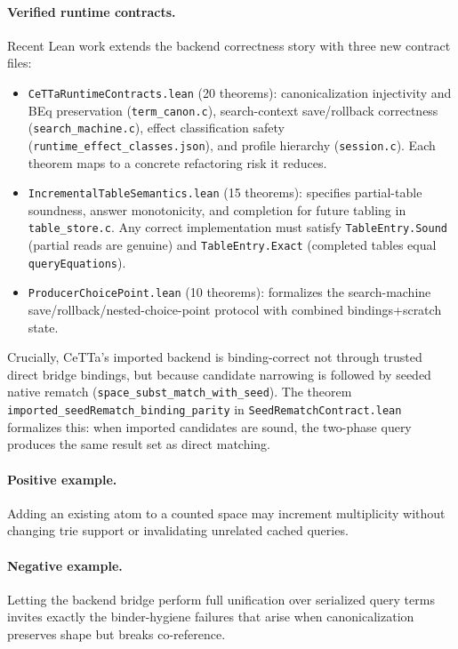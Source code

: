 \documentclass[11pt]{article}
\newcommand{\code}[1]{\texttt{#1}}
\newcommand{\CeTTa}{\textup{CeTTa}}
\begin{document}
\paragraph{Verified runtime contracts.}
Recent Lean work extends the backend correctness story with three new contract files:
\begin{itemize}
\item \code{CeTTaRuntimeContracts.lean} (20 theorems): canonicalization injectivity and BEq preservation (\code{term\_canon.c}), search-context save/rollback correctness (\code{search\_machine.c}), effect classification safety (\code{runtime\_effect\_classes.json}), and profile hierarchy (\code{session.c}).  Each theorem maps to a concrete refactoring risk it reduces.
\item \code{IncrementalTableSemantics.lean} (15 theorems): specifies partial-table soundness, answer monotonicity, and completion for future tabling in \code{table\_store.c}.  Any correct implementation must satisfy \code{TableEntry.Sound} (partial reads are genuine) and \code{TableEntry.Exact} (completed tables equal \code{queryEquations}).
\item \code{ProducerChoicePoint.lean} (10 theorems): formalizes the search-machine save/rollback/nested-choice-point protocol with combined bindings+scratch state.
\end{itemize}

Crucially, \CeTTa{}'s imported backend is binding-correct not through trusted direct bridge bindings, but because candidate narrowing is followed by seeded native rematch (\code{space\_subst\_match\_with\_seed}).  The theorem \code{imported\_seedRematch\_binding\_parity} in \code{SeedRematchContract.lean} formalizes this: when imported candidates are sound, the two-phase query produces the same result set as direct matching.

\paragraph{Positive example.}
Adding an existing atom to a counted space may increment multiplicity without
changing trie support or invalidating unrelated cached queries.

\paragraph{Negative example.}
Letting the backend bridge perform full unification over serialized query
terms invites exactly the binder-hygiene failures that arise when
canonicalization preserves shape but breaks co-reference.
\end{document}
